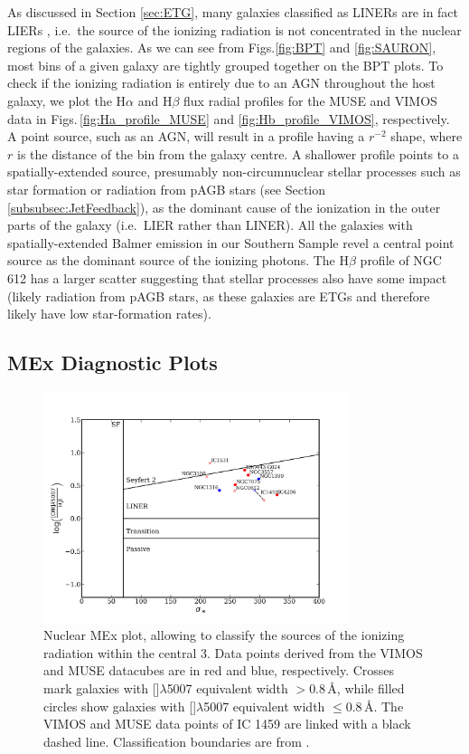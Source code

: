 		As discussed in Section \ref{sec:ETG}, many galaxies classified as LINERs are in fact LIERs \citep[see e.g.][]{Sarzi2005, Sarzi2010, Singh2013, Belfiore2016}, i.e.\ the source of the ionizing radiation is not concentrated in the nuclear regions of the galaxies. As we can see from Figs.\ref{fig:BPT} and \ref{fig:SAURON}, most bins of a given galaxy are tightly grouped together on the BPT plots. To check if the ionizing radiation is entirely due to an AGN throughout the host galaxy, we plot the H$\alpha$ and H$\beta$ flux radial profiles for the MUSE and VIMOS data in Figs.\,\ref{fig:Ha_profile_MUSE} and \ref{fig:Hb_profile_VIMOS}, respectively. A point source, such as an AGN, will result in a profile having a $r^{-2}$ shape, where $r$ is the distance of the bin from the galaxy centre. A shallower profile points to a spatially-extended source, presumably non-circumnuclear stellar processes such as star formation or radiation from pAGB stars (see Section \ref{subsubsec:JetFeedback}), as the dominant cause of the ionization in the outer parts of the galaxy (i.e.\ LIER rather than LINER). All the galaxies with spatially-extended Balmer emission in our Southern Sample revel a central point source as the dominant source of the ionizing photons. The H$\beta$ profile of NGC 612 has a larger scatter suggesting that stellar processes also have some impact (likely radiation from pAGB stars, as these galaxies are ETGs and therefore likely have low star-formation rates).

		


	\subsection{MEx Diagnostic Plots}
		\label{subsec:MEx}
		\begin{figure}
			\centering
			\includegraphics[width=0.8\textwidth]{chapter5/nuclear_MEx.png}
			\caption[Nuclear mass\,--\,excitation plot]{Nuclear MEx plot, allowing to classify the sources of the ionizing radiation within the central 3\arcsec. Data points derived from the VIMOS and MUSE datacubes are in red and blue, respectively. Crosses mark galaxies with []$\lambda$5007 equivalent width $> 0.8$\,\AA, while filled circles show galaxies with []$\lambda$5007 equivalent width $\leqslant 0.8$\,\AA. The VIMOS and MUSE data points of IC 1459 are linked with a black dashed line. Classification boundaries are from \citet{Nyland2016}.}
			\label{fig:MEx}
		\end{figure}

